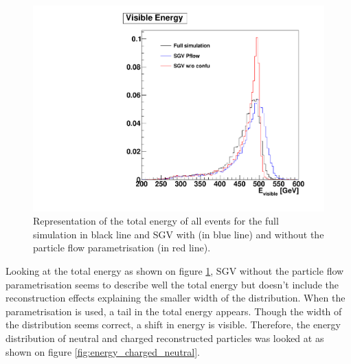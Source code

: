 \begin{figure}[t]
  \centering
  \includegraphics[width=1\linewidth]{chap6/fig_SGV/Evis.pdf}
  \caption{Representation of the total energy of all events for the full simulation in black line and SGV with (in blue line) and without the particle flow parametrisation (in red line).}
  \label{fig:energy_total}
\end{figure}

Looking at the total energy as shown on figure \ref{fig:energy_total}, SGV without the particle flow parametrisation seems to describe well the total energy but doesn't include the reconstruction effects explaining the smaller width of the distribution. When the parametrisation is used, a tail in the total energy appears. Though the width of the distribution seems correct, a shift in energy is visible. Therefore, the energy distribution of neutral and charged reconstructed particles was looked at as shown on figure \ref{fig:energy_charged_neutral}.

